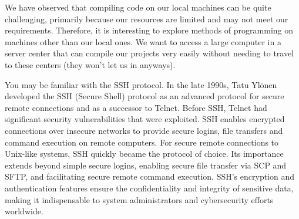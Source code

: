 \documentclass{dcbl/challenge}
\begin{document}
We have observed that compiling code on our local machines can be quite challenging, primarily because our resources are limited and may not meet our requirements. Therefore, it is interesting to explore methods of programming on machines other than our local ones. We want to access a large computer in a server center that can compile our projects very easily without needing to travel to these centers (they won't let us in anyways).

You may be familiar with the SSH protocol. 
In the late 1990s, Tatu Ylönen developed the SSH (Secure Shell) protocol as an advanced protocol for secure remote connections and as a successor to Telnet. Before SSH, Telnet had significant security vulnerabilities that were exploited. 
SSH enables encrypted connections over insecure networks to provide secure logins, file transfers and command execution on remote computers.
For secure remote connections to Unix-like systems, SSH quickly became the protocol of choice. Its importance extends beyond simple secure logins, enabling secure file transfer via SCP and SFTP, and facilitating secure remote command execution. SSH's encryption and authentication features ensure the confidentiality and integrity of sensitive data, making it indispensable to system administrators and cybersecurity efforts worldwide.
\end{document}
